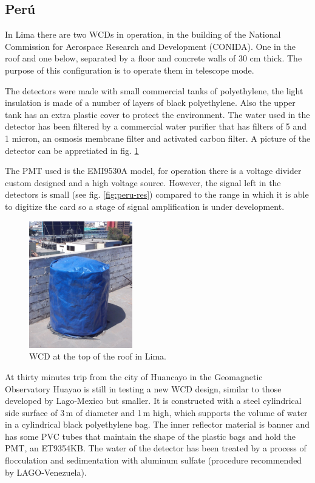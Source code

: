 \subsection{Per\'u}\label{subsec:per}

In Lima there are two WCDs in operation, in the building of the National
Commission for Aerospace Research and Development (CONIDA). One in the roof and
one below, separated by a floor and concrete walls of 30 cm thick. The purpose
of this configuration is to operate them in telescope mode.

The detectors were made with small commercial tanks of polyethylene, the light
insulation is made of a number of layers of black polyethylene. Also the upper
tank has an extra plastic cover to protect the environment. The water used in
the detector has been filtered by a commercial water purifier that has filters
of 5 and 1 micron, an osmosis membrane filter and activated carbon filter.
A picture of the detector can be appretiated in fig. \ref{fig:peru-site}

The PMT used is the EMI9530A model, for operation there is a voltage divider
custom designed and a high voltage source. However, the signal left in the
detectors is small (see fig. \ref{fig:peru-res}) compared to the range in which
it is able to digitize the card so a stage of signal amplification is under
development.

\begin{figure}[h!]
\begin{center}
\includegraphics[width=0.40\textwidth]{images/peru/wcd.jpg}
\caption{WCD at the top of the roof in Lima.}
\label{fig:peru-site}
\end{center}
\end{figure}

At thirty minutes trip from the city of Huancayo in the Geomagnetic Observatory
Huayao is still in testing a new WCD design, similar to those developed by
Lago-Mexico but smaller. It is constructed with a steel cylindrical side
surface of 3\,m of diameter and 1\,m high, which supports the volume of water
in a cylindrical black polyethylene bag. The inner reflector material is banner
and has some PVC tubes that maintain the shape of the plastic bags and hold the
PMT, an ET9354KB. The water of the detector has been treated by a process of
flocculation and sedimentation with aluminum sulfate (procedure recommended by
LAGO-Venezuela).

